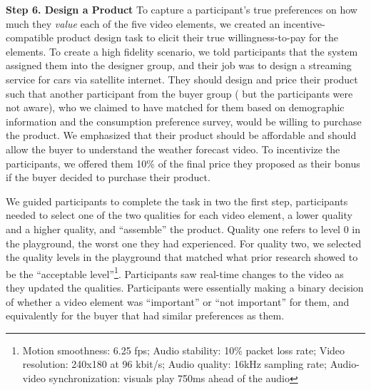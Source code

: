 {}

\textbf{Step 6. Design a Product} To capture a participant's true preferences on how much they \textit{value} each of the five video elements, we created an incentive-compatible product design task to elicit their true willingness-to-pay for the elements. To create a high fidelity scenario, we told participants that the system assigned them into the designer group, and their job was to design a streaming service for cars via satellite internet. They should design and price their product such that another participant from the buyer group ({} but the participants were not aware), who we claimed to have matched for them based on demographic information and the consumption preference survey, would be willing to purchase the product. We emphasized that their product should be affordable and should allow the buyer to understand the weather forecast video. To incentivize the participants, we offered them 10\% of the final price they proposed as their bonus if the buyer decided to purchase their product.

We guided participants to complete the task in two {} the first step, participants needed to select one of the two qualities for each video element, a lower quality and a higher quality, and ``assemble'' the product. Quality one refers to level 0 in the playground, the worst one they had experienced. For quality two, we selected the quality levels in the playground that matched what prior research showed to be the ``acceptable level''\footnote{Motion smoothness: 6.25 fps; Audio stability: 10\% packet loss rate; Video resolution: 240x180 at 96 kbit/s; Audio quality: 16kHz sampling rate; Audio-video synchronization: visuals play 750ms ahead of the audio}. Participants saw real-time changes to the video as they updated the qualities. Participants were essentially making a binary decision of whether a video element was ``important'' or ``not important'' for them, and equivalently for the buyer that had similar preferences as them. 

